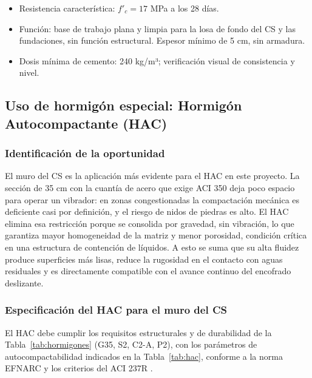 \begin{itemize}
    \item Resistencia característica: $f'_c = 17$ MPa a los 28 días.
    \item Función: base de trabajo plana y limpia para la losa de fondo del CS y las fundaciones, sin función estructural. Espesor mínimo de 5 cm, sin armadura.
    \item Dosis mínima de cemento: 240 kg/m³; verificación visual de consistencia y nivel.
\end{itemize}

\subsection{Uso de hormigón especial: Hormigón Autocompactante (HAC)}

\subsubsection{Identificación de la oportunidad}

El muro del CS es la aplicación más evidente para el HAC en este proyecto. La sección de 35 cm con la cuantía de acero que exige ACI 350 deja poco espacio para operar un vibrador: en zonas congestionadas la compactación mecánica es deficiente casi por definición, y el riesgo de nidos de piedras es alto. El HAC elimina esa restricción porque se consolida por gravedad, sin vibración, lo que garantiza mayor homogeneidad de la matriz y menor porosidad, condición crítica en una estructura de contención de líquidos. A esto se suma que su alta fluidez produce superficies más lisas, reduce la rugosidad en el contacto con aguas residuales y es directamente compatible con el avance continuo del encofrado deslizante.

\subsubsection{Especificación del HAC para el muro del CS}

El HAC debe cumplir los requisitos estructurales y de durabilidad de la Tabla~\ref{tab:hormigones} (G35, S2, C2-A, P2), con los parámetros de autocompactabilidad indicados en la Tabla~\ref{tab:hac}, conforme a la norma EFNARC \cite{EFNARC} y los criterios del ACI 237R \cite{ACI237}.

